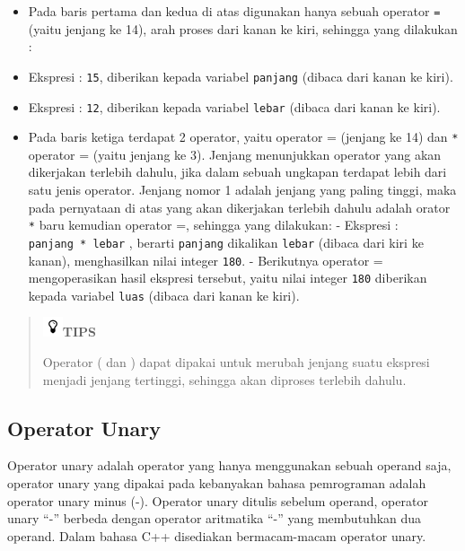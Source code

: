 \begin{itemize}

\item
  Pada baris pertama dan kedua di atas digunakan hanya sebuah operator
  \texttt{=} (yaitu jenjang ke 14), arah proses dari kanan ke kiri,
  sehingga yang dilakukan :
\item
  Ekspresi : \texttt{15}, diberikan kepada variabel \texttt{panjang}
  (dibaca dari kanan ke kiri).
\item
  Ekspresi : \texttt{12}, diberikan kepada variabel \texttt{lebar}
  (dibaca dari kanan ke kiri).
\item
  Pada baris ketiga terdapat 2 operator, yaitu operator =  (jenjang
  ke 14) dan \texttt{*} operator = (yaitu jenjang ke 3).
  Jenjang menunjukkan operator yang akan dikerjakan terlebih dahulu,
  jika dalam sebuah ungkapan terdapat lebih dari satu jenis operator.
  Jenjang nomor 1 adalah jenjang yang paling tinggi, maka pada
  pernyataan di atas yang akan dikerjakan terlebih dahulu adalah orator
  \texttt{*} baru kemudian operator =, sehingga yang dilakukan:
  - Ekspresi : \texttt{panjang\ *\ lebar} , berarti \texttt{panjang}
  dikalikan \texttt{lebar} (dibaca dari kiri ke kanan), menghasilkan
  nilai integer \texttt{180}. - Berikutnya operator = mengoperasikan
  hasil ekspresi tersebut, yaitu nilai integer \texttt{180} diberikan
  kepada variabel \texttt{luas} (dibaca dari kanan ke kiri).
\end{itemize}

\begin{quotation}
\includegraphics{../manuscript/images/tips.png}\textbf{TIPS}

Operator
( dan ) dapat dipakai untuk merubah jenjang suatu ekspresi
menjadi jenjang tertinggi, sehingga akan diproses terlebih dahulu.
\end{quotation}


\subsection{ Operator Unary}\label{a-operator-unary}

Operator unary adalah operator yang hanya menggunakan sebuah operand
saja, operator unary yang dipakai pada kebanyakan bahasa pemrograman
adalah operator unary minus (-). Operator unary ditulis sebelum operand,
operator unary ``-'' berbeda dengan operator aritmatika ``-'' yang
membutuhkan dua operand. Dalam bahasa C++ disediakan bermacam-macam
operator unary.

